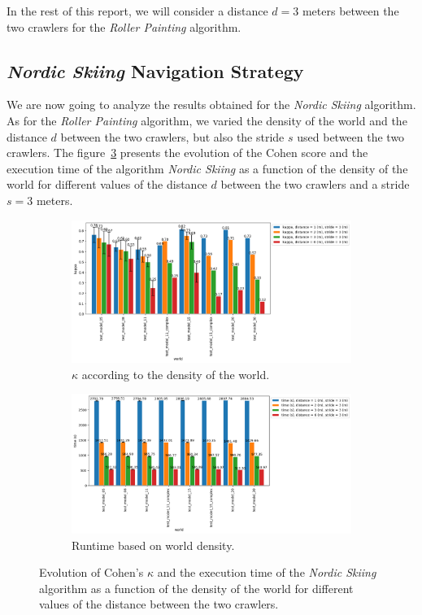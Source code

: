 In the rest of this report, we will consider a distance $d = 3$ meters between the two crawlers for the \textit{Roller Painting} algorithm.

\subsection*{\textit{Nordic Skiing} Navigation Strategy}

We are now going to analyze the results obtained for the \textit{Nordic Skiing} algorithm.
As for the \textit{Roller Painting} algorithm, we varied the density of the world and the distance $d$ between the two crawlers, but also the stride $s$ used between the two crawlers.
The figure~\ref{fig:ski_nordique-world_d} presents the evolution of the Cohen score and the execution time of the algorithm \textit{Nordic Skiing} as a function of the density of the world for different values of the distance $d$ between the two crawlers and a stride $s = 3$ meters.

\begin{figure}[h!]
	\centering
	\begin{subfigure}[t]{0.9\linewidth}
		\includegraphics[width=\linewidth]{graphics/ski_nordique-kappa_vs_world_for_each_d.png}
		\caption{$\kappa$ according to the density of the world.}
		\label{fig:ski_nordique-kappa_vs_world_d}
	\end{subfigure}
	\hfill
	\begin{subfigure}[t]{0.9\linewidth}
		\includegraphics[width=\linewidth]{graphics/ski_nordique-time_vs_world_for_each_d.png}
		\caption{Runtime based on world density.}
		\label{fig:ski_nordique-time_vs_world_d}
	\end{subfigure}
	\caption{Evolution of Cohen's $\kappa$ and the execution time of the \textit{Nordic Skiing} algorithm as a function of the density of the world for different values of the distance between the two crawlers.}
	\label{fig:ski_nordique-world_d}
\end{figure}

